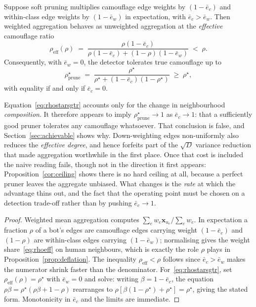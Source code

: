 \documentclass[../elsevier.tex]{subfiles}
\begin{document}
\begin{theorem}
\label{thm:sgtr}
Suppose soft pruning multiplies camouflage edge weights by $(1-\bar e_c)$ and
within-class edge weights by $(1-\bar e_w)$ in expectation, with
$\bar e_c > \bar e_w$. Then weighted aggregation behaves as unweighted aggregation
at the \emph{effective} camouflage ratio
\begin{equation}
    \rho_{\mathrm{eff}}(\rho)
    \;=\; \frac{\rho(1-\bar e_c)}{\rho(1-\bar e_c) + (1-\rho)(1-\bar e_w)}
    \;<\; \rho .
    \label{eq:rhoeff}
\end{equation}
Consequently, with $\bar e_w = 0$, the detector tolerates true camouflage up to
\begin{equation}
    \rho^\star_{\mathrm{prune}}
    \;=\; \frac{\rho^\star}{\rho^\star + (1-\bar e_c)(1-\rho^\star)}
    \;\geq\; \rho^\star,
    \label{eq:rhostarsgtr}
\end{equation}
with equality if and only if $\bar e_c = 0$.
\end{theorem}

\noindent
Equation~\eqref{eq:rhostarsgtr} accounts only for the change in neighbourhood
\emph{composition}. It therefore appears to imply
$\rho^\star_{\mathrm{prune}} \to 1$ as $\bar e_c \to 1$: that a sufficiently good
pruner tolerates any camouflage whatsoever. That conclusion is false, and
Section~\ref{sec:achievable} shows why. Down-weighting edges non-uniformly also
reduces the \emph{effective degree}, and hence forfeits part of the $\sqrt{D}$
variance reduction that made aggregation worthwhile in the first place. Once that
cost is included the naive reading fails, though not in the direction it first
appears: Proposition~\ref{cor:ceiling} shows there is no hard ceiling at all, because
a perfect pruner leaves the aggregate unbiased. What changes is the \emph{rate} at
which the advantage thins out, and the fact that the operating point must be chosen on
a detection trade-off rather than by pushing $\bar e_c \to 1$.

\begin{proof}
Weighted mean aggregation computes $\sum_e w_e \mathbf{x}_{u_e} / \sum_e w_e$. In
expectation a fraction $\rho$ of a bot's edges are camouflage edges carrying weight
$(1-\bar e_c)$ and $(1-\rho)$ are within-class edges carrying $(1-\bar e_w)$;
normalising gives the weight share~\eqref{eq:rhoeff} on human neighbours, which is
exactly the role $\rho$ plays in Proposition~\ref{prop:deflation}. The inequality
$\rho_{\mathrm{eff}} < \rho$ follows since $\bar e_c > \bar e_w$ makes the numerator
shrink faster than the denominator. For~\eqref{eq:rhostarsgtr}, set
$\rho_{\mathrm{eff}}(\rho) = \rho^\star$ with $\bar e_w = 0$ and solve: writing
$\beta = 1-\bar e_c$, the equation $\rho\beta = \rho^\star(\rho\beta + 1 - \rho)$
rearranges to $\rho[\beta(1-\rho^\star) + \rho^\star] = \rho^\star$, giving the
stated form. Monotonicity in $\bar e_c$ and the limits are immediate.
\end{proof}
\end{document}
